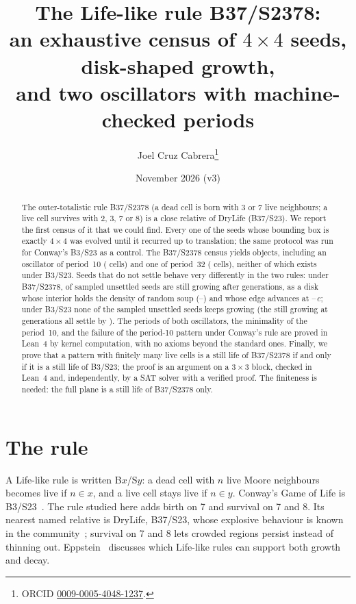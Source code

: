 \documentclass[11pt,a4paper]{article}
\title{The Life-like rule B37/S2378:\\
an exhaustive census of $4\times4$ seeds, disk-shaped growth,\\
and two oscillators with machine-checked periods}
\author{Joel Cruz Cabrera\thanks{ORCID \href{https://orcid.org/0009-0005-4048-1237}{0009-0005-4048-1237}.}}
\date{November 2026 (v3)}
\begin{document}
\maketitle

\begin{abstract}
The outer-totalistic rule B37/S2378 (a dead cell is born with 3 or 7 live neighbours;
a live cell survives with 2, 3, 7 or 8) is a close relative of DryLife (B37/S23).
We report the first census of it that we could find. Every one of the
\evaluadasCasaSemillas{} seeds whose bounding box is exactly $4\times4$ was evolved until it
recurred up to translation; the same protocol was run for Conway's B3/S23 as a control. The
B37/S2378 census yields \objetosCasa{} objects, including an oscillator of period~10
(\pobDiez{} cells) and one of period~32 (\pobTreintaydos{} cells), neither of which
exists under B3/S23. Seeds that do not settle behave very differently in the two rules:
under B37/S2378, \crecCasaCrece{} of \evaluadasCasa{} sampled unsettled seeds are
still growing after \lejosCasa{} generations, as a disk whose interior holds the density
of random soup (\densmin--\densmax) and whose edge advances at
\velmin--\velmax{}\,$c$; under B3/S23 none of the \evaluadasConway{} sampled
unsettled seeds keeps growing (the \crecConwayCrece{} still growing at \lejosConway{}
generations all settle by \lejoslejosConway). The periods of both oscillators,
the minimality of the period~10, and the failure of the period-10 pattern under
Conway's rule are proved in Lean~4 by kernel computation, with no axioms beyond the
standard ones. Finally, we prove that a pattern with finitely many live cells is a still
life of B37/S2378 if and only if it is a still life of B3/S23; the proof is an argument on a
$3\times3$ block, checked in Lean~4 and, independently, by a SAT solver with a verified
proof. The finiteness is needed: the full plane is a still life of B37/S2378 only.
\end{abstract}

\section{The rule}

A Life-like rule is written B$x$/S$y$: a dead cell with $n$ live Moore neighbours
becomes live if $n\in x$, and a live cell stays live if $n\in y$. Conway's Game of Life
is B3/S23~\cite{gardner1970}. The rule studied here adds birth on 7 and survival on 7
and 8. Its nearest named relative is DryLife, B37/S23, whose explosive behaviour is
known in the community~\cite{lifewiki-lifelike}; survival on 7 and 8 lets crowded
regions persist instead of thinning out. Eppstein~\cite{eppstein} discusses which
Life-like rules can support both growth and decay.
\end{document}
